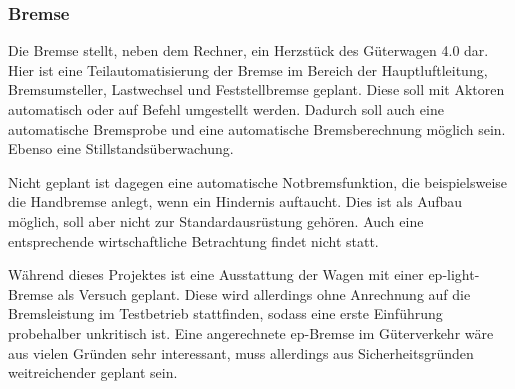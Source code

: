 \subsubsection{Bremse}
Die Bremse stellt, neben dem Rechner, ein Herzstück des Güterwagen 4.0  dar.
Hier ist eine Teilautomatisierung der Bremse im Bereich der Hauptluftleitung, Bremsumsteller, Lastwechsel und Feststellbremse geplant. Diese soll mit Aktoren automatisch oder auf Befehl umgestellt werden. Dadurch soll auch eine automatische Bremsprobe und eine automatische Bremsberechnung möglich sein. Ebenso eine Stillstandsüberwachung.\par
Nicht geplant ist dagegen eine automatische Notbremsfunktion, die beispielsweise die Handbremse anlegt, wenn ein Hindernis auftaucht. Dies ist als Aufbau möglich, soll aber nicht zur Standardausrüstung gehören. Auch eine entsprechende wirtschaftliche Betrachtung findet nicht statt.\par
Während dieses Projektes ist eine Ausstattung der Wagen mit einer ep-light-Bremse als Versuch geplant. Diese wird allerdings ohne Anrechnung auf die Bremsleistung im Testbetrieb stattfinden, sodass eine erste Einführung probehalber unkritisch ist. Eine angerechnete ep-Bremse im Güterverkehr wäre aus vielen Gründen sehr interessant, muss allerdings aus Sicherheitsgründen weitreichender geplant sein.\par

